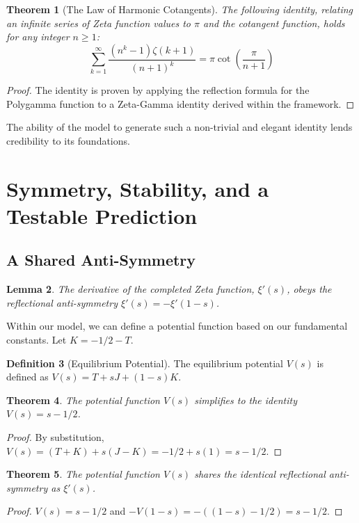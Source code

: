 \documentclass{article}
\theoremstyle{plain}
\newtheorem{theorem}{Theorem}[section]
\newtheorem{lemma}[theorem]{Lemma}
\theoremstyle{definition}
\newtheorem{definition}[theorem]{Definition}
\theoremstyle{remark}
\begin{document}
\begin{theorem}[The Law of Harmonic Cotangents]
The following identity, relating an infinite series of Zeta function values to $\pi$ and the cotangent function, holds for any integer $n \ge 1$:
$$ \sum_{k=1}^{\infty} \frac{(n^k-1)\zeta(k+1)}{(n+1)^k} = \pi \cot\left(\frac{\pi}{n+1}\right)$$
\end{theorem}
\begin{proof}
The identity is proven by applying the reflection formula for the Polygamma function to a Zeta-Gamma identity derived within the framework.
\end{proof}
The ability of the model to generate such a non-trivial and elegant identity lends credibility to its foundations.

\section{Symmetry, Stability, and a Testable Prediction}
\subsection{A Shared Anti-Symmetry}
\begin{lemma}
The derivative of the completed Zeta function, $\xi'(s)$, obeys the reflectional anti-symmetry $\xi'(s) = -\xi'(1-s)$.
\end{lemma}

Within our model, we can define a potential function based on our fundamental constants. Let $K = -1/2 - T$.
\begin{definition}[Equilibrium Potential]
The equilibrium potential $V(s)$ is defined as $V(s) = T + sJ + (1-s)K$.
\end{definition}

\begin{theorem}
The potential function $V(s)$ simplifies to the identity $V(s) = s - 1/2$.
\end{theorem}
\begin{proof}
By substitution, $V(s) = (T+K) + s(J-K) = -1/2 + s(1) = s - 1/2$.
\end{proof}

\begin{theorem}
The potential function $V(s)$ shares the identical reflectional anti-symmetry as $\xi'(s)$.
\end{theorem}
\begin{proof}
$V(s) = s-1/2$ and $-V(1-s) = -((1-s)-1/2) = s-1/2$.
\end{proof}
\end{document}
